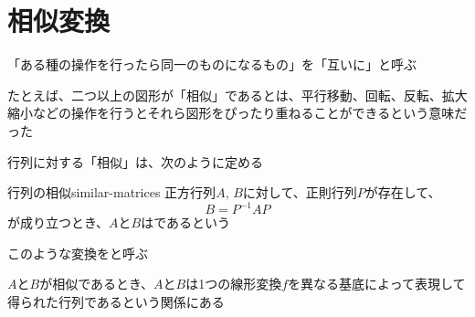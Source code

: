 \documentclass[../../../topic_linear-algebra]{subfiles}
\begin{document}
\sectionline
\section{相似変換}

「ある種の操作を行ったら同一のものになるもの」を「互いに」と呼ぶ

\br

たとえば、二つ以上の図形が「相似」であるとは、平行移動、回転、反転、拡大縮小などの操作を行うとそれら図形をぴったり重ねることができるという意味だった

\br

行列に対する「相似」は、次のように定める

\begin{definition}{行列の相似}{similar-matrices}
  正方行列$A,\,B$に対して、正則行列$P$が存在して、
  \begin{equation*}
    B = P^{-1} A P
  \end{equation*}
  が成り立つとき、$A$と$B$はであるという
\end{definition}

このような変換をと呼ぶ

\br

$A$と$B$が相似であるとき、$A$と$B$は1つの線形変換$f$を異なる基底によって表現して得られた行列であるという関係にある
\end{document}
